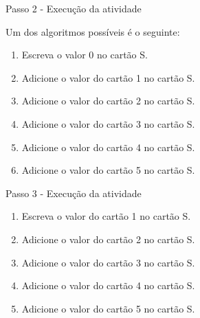 \documentclass{beamer}
\begin{document}
\begin{frame}{Passo 2 - Execução da atividade}

Um dos algoritmos possíveis é o seguinte:

\begin{enumerate}
    \item <1->Escreva o valor 0 no cartão S.
    \item <2->Adicione o valor do cartão 1 no cartão S.
    \item <3->Adicione o valor do cartão 2 no cartão S.
    \item <4->Adicione o valor do cartão 3 no cartão S.
    \item <5->Adicione o valor do cartão 4 no cartão S.
    \item <6->Adicione o valor do cartão 5 no cartão S.
\end{enumerate}


\end{frame}


\begin{frame}{Passo 3 - Execução da atividade}



\begin{enumerate}
    \item <1->Escreva o valor do cartão 1 no cartão S.
    \item <2->Adicione o valor do cartão 2 no cartão S.
    \item <3->Adicione o valor do cartão 3 no cartão S.
    \item <4->Adicione o valor do cartão 4 no cartão S.
    \item <5->Adicione o valor do cartão 5 no cartão S.
\end{enumerate}


\end{frame}
\end{document}
